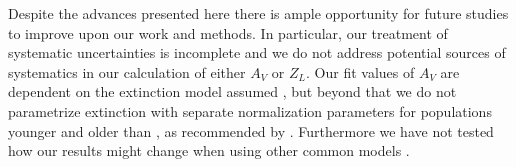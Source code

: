 



Despite the advances presented here there is ample opportunity for
future studies to improve upon our work and methods. In particular,
our treatment of systematic uncertainties is incomplete and we do not
address potential sources of systematics in our calculation of either
$A_V$ or $Z_L$. Our fit values of $A_V$ are dependent on the
extinction model assumed \citep[i.e.,][]{Charlot00}, but beyond that
we do not parametrize extinction with separate normalization
parameters for populations younger and older than ,
as recommended by \citet{Charlot00}. Furthermore we have not tested
how our results might change when using other common models
\citep[e.g.,][]{Calzetti94}.

